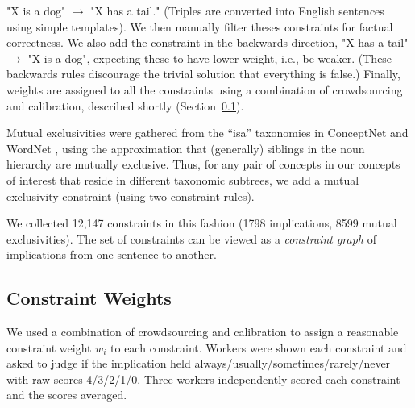 \documentclass[11pt]{article}
\newcommand{\eat}[1]{}
\newcommand{\red}[1]{\textcolor{red}{#1}}
\begin{document}
"X is a dog" $\rightarrow$ "X has a tail." %
(Triples are converted into English sentences using simple templates).
We then manually filter theses constraints for factual correctness.
We also add the constraint in the backwards direction, "X has a tail" $\rightarrow$ "X is a dog",
expecting these to have lower weight, i.e., be weaker.
(These backwards rules discourage the trivial solution that everything is false.)
Finally, weights are assigned to
all the constraints using a combination of crowdsourcing and calibration,
described shortly (Section~\ref{section:penalties}).

\eat{
resulting in 
to exclude wrong implications like \red{XXX}. Finally, we use crowdsourceing to validate these constraints, see \ref{section:penalties}.
}
\eat{Mutual exclusivities were gathered from a filtered subset of the WordNet taxonomy,
based on the approximation that (generally) siblings in the WordNet noun hierarchy
are mutually exclusive \red{elaborate}.
}

Mutual exclusivities were gathered from the ``isa'' taxonomies in ConceptNet and WordNet \cite{wordnet},
using the approximation that (generally) siblings in the noun hierarchy are mutually exclusive.
Thus, for any pair of concepts in our concepts of interest that reside in different taxonomic subtrees,
we add a mutual exclusivity constraint (using two constraint rules). 

We collected 12,147 constraints in this fashion (1798 implications, 8599 mutual
exclusivities). The set of constraints can be %
viewed as a {\it constraint graph} of implications from one sentence to another.

\subsection{Constraint Weights}
\label{section:penalties}
We used a combination of crowdsourcing and calibration to assign a reasonable
constraint weight $w_i$ to each constraint. Workers were shown each
constraint and asked to judge if the implication held always/usually/sometimes/rarely/never with raw scores 
4/3/2/1/0. 
Three workers independently scored each constraint and the scores averaged.
\end{document}
